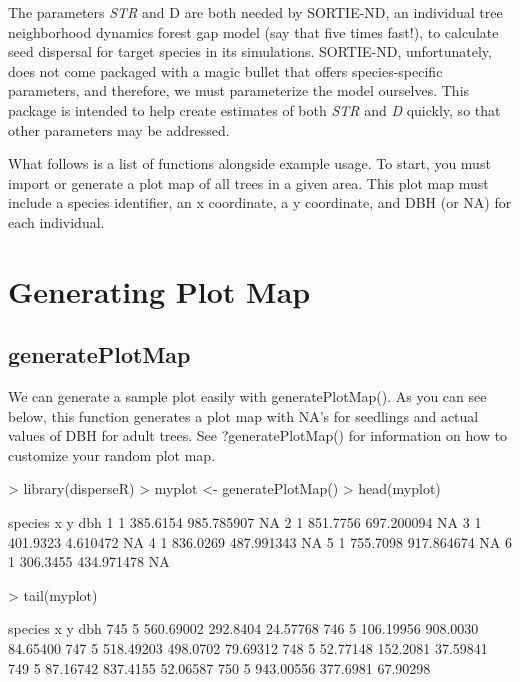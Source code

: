 \documentclass{article}
\begin{document}
The parameters \textit{STR} and {D} are both needed by SORTIE-ND, an individual tree neighborhood dynamics forest gap model (say that five times fast!), to calculate seed dispersal for target species in its simulations. SORTIE-ND, unfortunately, does not come packaged with a magic bullet that offers species-specific parameters, and therefore, we must parameterize the model ourselves. This package is intended to help create estimates of both \textit{STR} and \textit{D} quickly, so that other parameters may be addressed.

What follows is a list of functions alongside example usage. To start, you must import or generate a plot map of all trees in a given area. This plot map must include a species identifier, an x coordinate, a y coordinate, and DBH (or NA) for each individual.

\section{Generating Plot Map}

\subsection{generatePlotMap}
We can generate a sample plot easily with generatePlotMap(). As you can see below, this function generates a plot map with NA's for seedlings and actual values of DBH for adult trees. See ?generatePlotMap() for information on how to customize your random plot map.
\begin{Schunk}
\begin{Sinput}
> library(disperseR)
> myplot <- generatePlotMap()
> head(myplot)
\end{Sinput}
\begin{Soutput}
  species        x          y dbh
1       1 385.6154 985.785907  NA
2       1 851.7756 697.200094  NA
3       1 401.9323   4.610472  NA
4       1 836.0269 487.991343  NA
5       1 755.7098 917.864674  NA
6       1 306.3455 434.971478  NA
\end{Soutput}
\begin{Sinput}
> tail(myplot)
\end{Sinput}
\begin{Soutput}
    species         x        y      dbh
745       5 560.69002 292.8404 24.57768
746       5 106.19956 908.0030 84.65400
747       5 518.49203 498.0702 79.69312
748       5  52.77148 152.2081 37.59841
749       5  87.16742 837.4155 52.06587
750       5 943.00556 377.6981 67.90298
\end{Soutput}
\end{Schunk}
\end{document}
